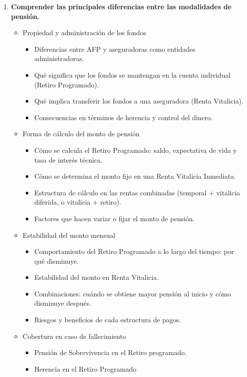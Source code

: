 \begin{enumerate}
\item \textbf{Comprender las principales diferencias entre las modalidades de pensión.}
\begin{itemize}
    \item Propiedad y administración de los fondos
    \begin{itemize}
        \item Diferencias entre AFP y aseguradoras como entidades administradoras.
        \item Qué significa que los fondos se mantengan en la cuenta individual (Retiro Programado).
        \item Qué implica transferir los fondos a una aseguradora (Renta Vitalicia).
        \item Consecuencias en términos de herencia y control del dinero.
    \end{itemize}
    \item Forma de cálculo del monto de pensión
    \begin{itemize}
        \item Cómo se calcula el Retiro Programado: saldo, expectativa de vida y tasa de interés técnica.
        \item Cómo se determina el monto fijo en una Renta Vitalicia Inmediata.
        \item Estructura de cálculo en las rentas combinadas (temporal + vitalicia diferida, o vitalicia + retiro).
        \item Factores que hacen variar o fijar el monto de pensión.
    \end{itemize}
    \item Estabilidad del monto mensual
    \begin{itemize}
        \item Comportamiento del Retiro Programado a lo largo del tiempo: por qué disminuye.
        \item Estabilidad del monto en Renta Vitalicia.
        \item Combinaciones: cuándo se obtiene mayor pensión al inicio y cómo disminuye después.
        \item Riesgos y beneficios de cada estructura de pagos.
    \end{itemize}
    \item Cobertura en caso de fallecimiento
    \begin{itemize}
        \item Pensión de Sobrevivencia en el Retiro programado. 
        \item Herencia en el Retiro Programado

\end{itemize}
\end{itemize}
\end{enumerate}
